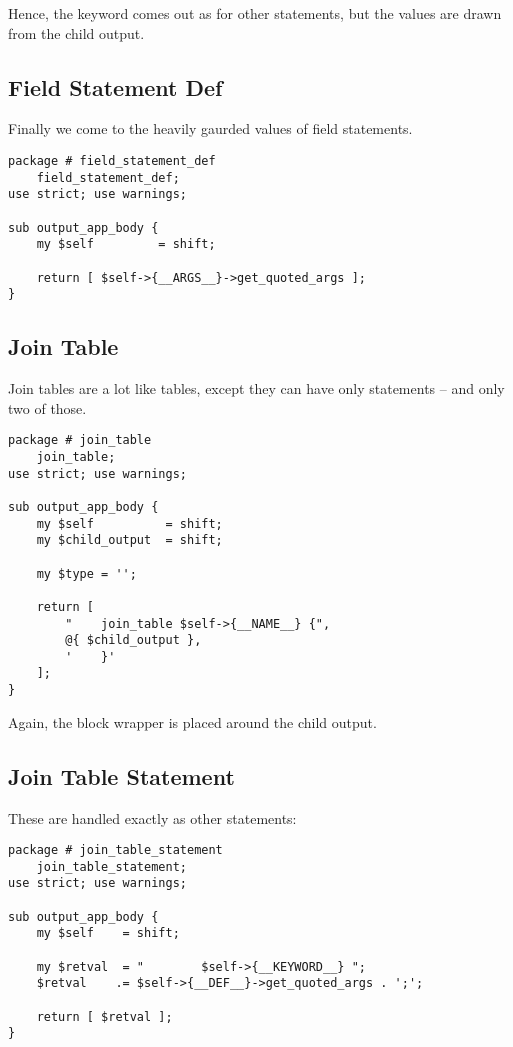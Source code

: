 Hence, the keyword comes out as for other statements, but the values are
drawn from the child output.

\subsection*{Field Statement Def}

Finally we come to the heavily gaurded values of field statements.

\begin{verbatim}
package # field_statement_def
    field_statement_def;
use strict; use warnings;

sub output_app_body {
    my $self         = shift;

    return [ $self->{__ARGS__}->get_quoted_args ];
}
\end{verbatim}

\subsection*{Join Table}

Join tables are a lot like tables, except they can have only statements
-- and only two of those.

\begin{verbatim}
package # join_table
    join_table;
use strict; use warnings;

sub output_app_body {
    my $self          = shift;
    my $child_output  = shift;

    my $type = '';

    return [
        "    join_table $self->{__NAME__} {",
        @{ $child_output },
        '    }'
    ];
}
\end{verbatim}

Again, the block wrapper is placed around the child output.

\subsection*{Join Table Statement}

These are handled exactly as other statements:

\begin{verbatim}
package # join_table_statement
    join_table_statement;
use strict; use warnings;

sub output_app_body {
    my $self    = shift;

    my $retval  = "        $self->{__KEYWORD__} ";
    $retval    .= $self->{__DEF__}->get_quoted_args . ';';

    return [ $retval ];
}
\end{verbatim}

